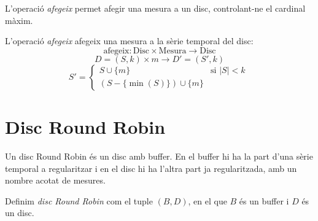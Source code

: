 L'operació \emph{afegeix} permet afegir una mesura a un disc, controlant-ne el cardinal màxim.

\begin{definition}
  L'operació \emph{afegeix} afegeix una mesura a la sèrie temporal del disc:
  \[
  \text{afegeix}: \text{Disc} \times \text{Mesura} \longrightarrow \text{Disc}
  \]
  \[
  D=(S,k) \times m \longrightarrow D'= (S',k)
  \]
  \[
  S' =  
  \begin{cases}
      S\cup\{m\} &\text{si }  |S|<k\\
      (S-\{\min(S)\}) \cup \{m\} 
    \end{cases}  \
  \]
\end{definition}


\section{Disc Round Robin}\label{sec:model:discroundrobin}

Un disc Round Robin és un disc amb buffer. En el buffer hi ha la part d'una sèrie temporal a regularitzar i en el disc hi ha l'altra part ja regularitzada, amb un nombre acotat de mesures. 

\begin{definition}
  Definim \emph{disc Round Robin} com el tuple $(B,D)$, en el que $B$
  és un buffer i $D$ és un disc.
\end{definition}
 
